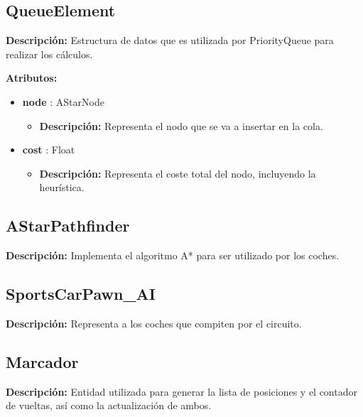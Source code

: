 \subsection{QueueElement}
\textbf{Descripción: }Estructura de datos que es utilizada por PriorityQueue para realizar los cálculos.

\bigskip

\textbf{Atributos: }
\begin{itemize}
    \item \textbf{node} : AStarNode
    \begin{itemize}
        \item \textbf{Descripción: }Representa el nodo que se va a insertar en la cola.
    \end{itemize}

    \item \textbf{cost} : Float
    \begin{itemize}
        \item \textbf{Descripción: }Representa el coste total del nodo, incluyendo la heurística.
    \end{itemize}
\end{itemize}
\subsection{AStarPathfinder}
\textbf{Descripción: }Implementa el algoritmo A* para ser utilizado por los coches.


\subsection{SportsCarPawn\_AI}
\textbf{Descripción: }Representa a los coches que compiten por el circuito.

\subsection{Marcador}
\textbf{Descripción: }Entidad utilizada para generar la lista de posiciones y el contador de vueltas, así como la actualización de ambos.

\bigskip

